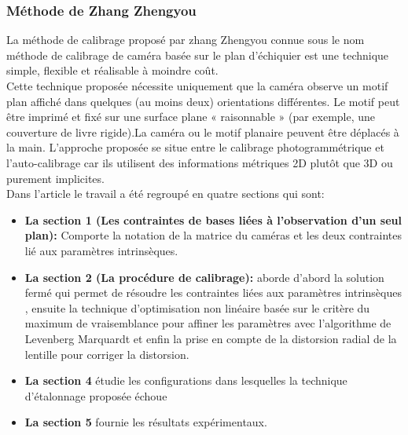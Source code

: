 \subsubsection{Méthode de Zhang Zhengyou}

 La méthode de calibrage proposé par zhang Zhengyou connue sous le nom méthode de calibrage de caméra basée sur le plan d'échiquier est une technique simple, flexible et réalisable à moindre coût.\\ 
Cette technique proposée nécessite uniquement que la caméra observe un motif plan affiché dans quelques (au moins deux) orientations
différentes. Le motif peut être imprimé et fixé sur une surface plane « raisonnable » (par exemple, une couverture de livre rigide).La caméra ou le motif planaire peuvent être déplacés à la main. L'approche proposée se situe entre le calibrage photogrammétrique et l'auto-calibrage car ils utilisent des informations métriques 2D plutôt que 3D ou purement implicites. \\

Dans l'article le travail a été regroupé en quatre sections qui sont:\\

\begin{itemize}
	\item \textbf{La section 1 (Les contraintes de bases liées à l'observation d'un seul plan):} Comporte la notation de la matrice du caméras et les deux contraintes lié aux paramètres intrinsèques.\\
	
	\item \textbf{La section 2 (La procédure de calibrage):}  aborde d'abord la solution fermé qui permet de résoudre les contraintes liées aux paramètres intrinsèques , ensuite la technique d'optimisation non linéaire basée sur le critère du maximum de vraisemblance pour affiner les paramètres avec l'algorithme de Levenberg ­Marquardt et enfin la prise en compte de la distorsion radial de la lentille pour corriger la distorsion.\\
	
	\item \textbf{La section 4} étudie les configurations dans lesquelles la technique d'étalonnage proposée échoue\\
	
	\item \textbf{La section 5} fournie les résultats expérimentaux.
\end{itemize}


\newpage
